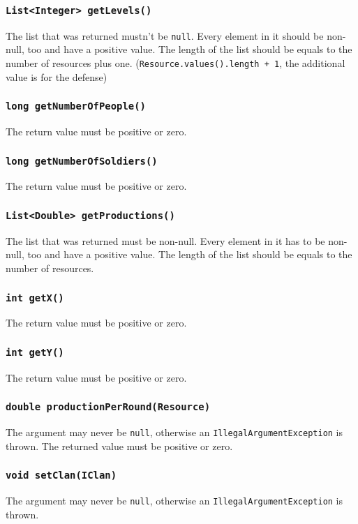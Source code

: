 \documentclass{article}
\begin{document}
\subsubsection{\texttt{List<Integer> getLevels()}}
The list that was returned mustn't be \texttt{null}. Every element in it
should be non-null, too and have a positive value.
The length of the list should be equals to the number of resources plus one.
(\texttt{Resource.values().length + 1}, the additional value is for the defense)

\subsubsection{\texttt{long getNumberOfPeople()}}
The return value must be positive or zero.

\subsubsection{\texttt{long getNumberOfSoldiers()}}
The return value must be positive or zero.

\subsubsection{\texttt{List<Double> getProductions()}}
The list that was returned must be non-null. Every element in it has to be non-null,
too and have a positive value.
The length of the list should be equals to the number of resources.

\subsubsection{\texttt{int getX()}}
The return value must be positive or zero.

\subsubsection{\texttt{int getY()}}
The return value must be positive or zero.

\subsubsection{\texttt{double productionPerRound(Resource)}}
The argument may never be \texttt{null}, otherwise an \texttt{IllegalArgumentException} is thrown.
The returned value must be positive or zero.

\subsubsection{\texttt{void setClan(IClan)}}
The argument may never be \texttt{null}, otherwise an \texttt{IllegalArgumentException} is thrown.
\end{document}
